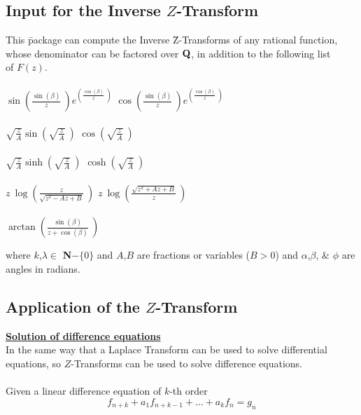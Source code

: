 \subsection{Input for the Inverse $Z$-Transform}
\begin{tabbing}
  This \= package can compute the Inverse \= Z-Transforms of any 
  rational function, \\ whose denominator can be factored over 
  ${\bf Q}$, in addition to the following list \\ of $F(z)$.\\ \\

\> $\sin \left(\frac{\sin (\beta)}{z} \ \right) 
    e^{\left(\frac{\cos (\beta)}{z} \ \right)}$
\> $\cos \left(\frac{\sin (\beta)}{z} \ \right) 
    e^{\left(\frac{\cos (\beta)}{z} \ \right)}$ \\ \\
\> $\sqrt{\frac{z}{A}} \sin \left( \sqrt{\frac{z}{A}} \ \right)$
\> $\cos \left( \sqrt{\frac{z}{A}} \ \right)$ \\ \\
\> $\sqrt{\frac{z}{A}} \sinh \left( \sqrt{\frac{z}{A}} \ \right)$
\> $\cosh \left( \sqrt{\frac{z}{A}} \ \right)$ \\ \\
\> $z \ \log \left(\frac{z}{\sqrt{z^2-A z+B}} \ \right)$
\> $z \ \log \left(\frac{\sqrt{z^2+A z+B}}{z} \ \right)$ \\ \\
\> $\arctan \left(\frac{\sin (\beta)}{z+\cos (\beta)} \ \right)$
\\
\end{tabbing}

  where $k$,$\lambda \in$ {\bf N}$ -  \{0\}$ and $A$,$B$ are fractions
  or variables ($B>0$) and $\alpha$,$\beta$, \&  $\phi$ are angles 
  in radians.

\subsection{Application of the $Z$-Transform}
\underline {{\bf Solution of difference equations}}\\

  In the same way that a Laplace Transform can be used to
  solve differential equations, so $Z$-Transforms can be used
  to solve difference equations.\\ \\
  Given a linear difference equation of $k$-th order
\begin{equation}
  f_{n+k} + a_1 f_{n+k-1}+ \ldots + a_k f_n = g_n
\label{eq:1}
\end{equation}

